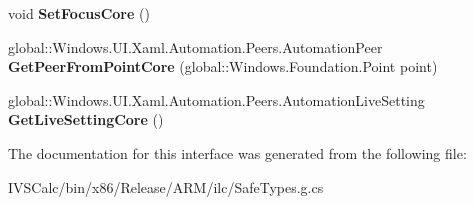 \begin{DoxyCompactItemize}
void {\bfseries Set\+Focus\+Core} ()
\item 
\mbox{\label{interface_windows_1_1_u_i_1_1_xaml_1_1_automation_1_1_peers_1_1_i_automation_peer_overrides_a74922a18e90493219309cd53efda7477}} 
global\+::\+Windows.\+U\+I.\+Xaml.\+Automation.\+Peers.\+Automation\+Peer {\bfseries Get\+Peer\+From\+Point\+Core} (global\+::\+Windows.\+Foundation.\+Point point)
\item 
\mbox{\label{interface_windows_1_1_u_i_1_1_xaml_1_1_automation_1_1_peers_1_1_i_automation_peer_overrides_ae9707214745a3c5f651e9c0fee6879ea}} 
global\+::\+Windows.\+U\+I.\+Xaml.\+Automation.\+Peers.\+Automation\+Live\+Setting {\bfseries Get\+Live\+Setting\+Core} ()
\end{DoxyCompactItemize}


The documentation for this interface was generated from the following file\+:\begin{DoxyCompactItemize}
\item 
I\+V\+S\+Calc/bin/x86/\+Release/\+A\+R\+M/ilc/Safe\+Types.\+g.\+cs\end{DoxyCompactItemize}
